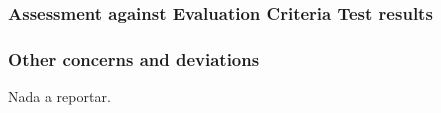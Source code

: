 \subsubsection*{Assessment against Evaluation Criteria Test results}


\subsubsection*{Other concerns and deviations}
Nada a reportar.
